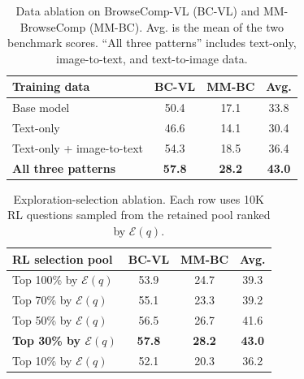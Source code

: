 \begin{table}[t]
\centering
\footnotesize
\setlength{\tabcolsep}{4pt}
\renewcommand{\arraystretch}{1.12}
\begin{tabularx}{\columnwidth}{@{}>{\raggedright\arraybackslash}X c c c@{}}
\toprule
\textbf{Training data} & \textbf{BC-VL} & \textbf{MM-BC} & \textbf{Avg.} \\
\midrule
Base model & 50.4 & 17.1 & 33.8 \\
\midrule
Text-only & 46.6 & 14.1 & 30.4 \\
Text-only + image-to-text & 54.3 & 18.5 & 36.4 \\
\textbf{All three patterns} & \textbf{57.8} & \textbf{28.2} & \textbf{43.0} \\
\bottomrule
\end{tabularx}
\caption{Data ablation on BrowseComp-VL (BC-VL) and MM-BrowseComp (MM-BC). Avg. is the mean of the two benchmark scores. ``All three patterns'' includes text-only, image-to-text, and text-to-image data.}
\label{tab:ablation_results}
\end{table}


\begin{table}[t]
\centering
\footnotesize
\setlength{\tabcolsep}{4pt}
\renewcommand{\arraystretch}{1.12}
\begin{tabularx}{\columnwidth}{@{}>{\raggedright\arraybackslash}X c c c@{}}
\toprule
\textbf{RL selection pool} & \textbf{BC-VL} & \textbf{MM-BC} & \textbf{Avg.} \\
\midrule
Top 100\% by $\mathcal{E}(q)$ & 53.9 & 24.7 & 39.3 \\
Top 70\% by $\mathcal{E}(q)$ & 55.1 & 23.3 & 39.2 \\
Top 50\% by $\mathcal{E}(q)$ & 56.5 & 26.7 & 41.6 \\
\textbf{Top 30\% by $\mathcal{E}(q)$} & \textbf{57.8} & \textbf{28.2} & \textbf{43.0} \\
Top 10\% by $\mathcal{E}(q)$ & 52.1 & 20.3 & 36.2 \\
\bottomrule
\end{tabularx}
\caption{Exploration-selection ablation. Each row uses 10K RL questions sampled from the retained pool ranked by $\mathcal{E}(q)$.}
\label{tab:selection_ablation_results}
\end{table}
